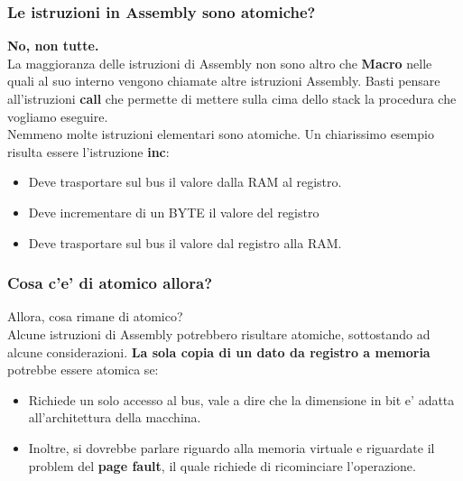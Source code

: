 \documentclass{article}
\begin{document}
        \newpage
        \subsubsection{Le istruzioni in Assembly sono atomiche?}
            \textbf{No, non tutte.}
            \\
            La maggioranza delle istruzioni di Assembly non sono altro che \textbf{Macro} nelle quali al suo interno vengono chiamate altre istruzioni Assembly.
            Basti pensare all'istruzioni \textbf{call} che permette di mettere sulla cima dello stack la procedura che vogliamo eseguire.
            \\
            Nemmeno molte istruzioni elementari sono atomiche.
            Un chiarissimo esempio risulta essere l'istruzione \textbf{inc}:
            \begin{itemize}
               \item Deve trasportare sul bus il valore dalla RAM al registro. 
               \item Deve incrementare di un BYTE il valore del registro
               \item Deve trasportare sul bus il valore dal registro alla RAM.
            \end{itemize}    
        \subsubsection{Cosa c'e' di atomico allora?}
            Allora, cosa rimane di atomico?
            \\
            Alcune istruzioni di Assembly potrebbero risultare atomiche, sottostando ad alcune considerazioni.
            \textbf{La sola copia di un dato da registro a memoria } 
            potrebbe essere atomica se:
            \begin{itemize}
               \item Richiede un solo accesso al bus, vale a dire che 
               la dimensione in bit e' adatta all'architettura della 
               macchina.
               \item Inoltre, si dovrebbe parlare riguardo alla memoria 
                virtuale e riguardate il problem del \textbf{page fault},
                il quale richiede di ricominciare l'operazione.
            \end{itemize}
\end{document}
